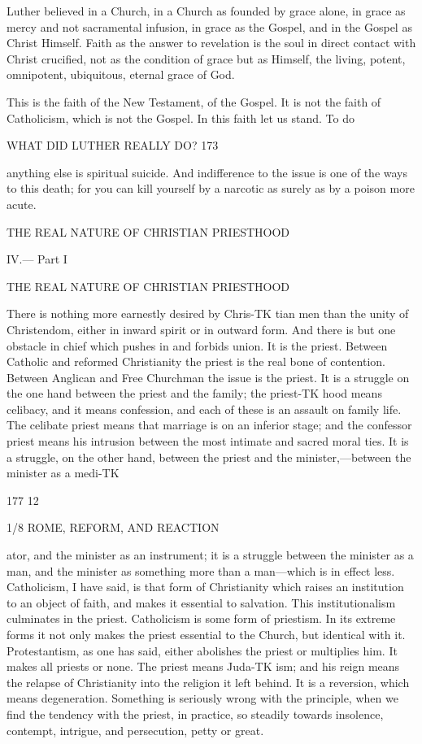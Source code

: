 \documentclass[12pt,a5paper,oneside]{book}
\begin{document}
{Luther believed in a Church, in a Church as founded 
by grace alone, in grace as mercy and not sacramental 
infusion, in grace as the Gospel, and in the Gospel as 
Christ Himself. Faith as the answer to revelation is 
the soul in direct contact with Christ crucified, not 
as the condition of grace but as Himself, the living, 
potent, omnipotent, ubiquitous, eternal grace of God. 

This is the faith of the New Testament, of the 
Gospel. It is not the faith of Catholicism, which is 
not the Gospel. In this faith let us stand. To do 



WHAT DID LUTHER REALLY DO? 173 

anything else is spiritual suicide. And indifference to 
the issue is one of the ways to this death; for you can 
kill yourself by a narcotic as surely as by a poison 
more acute. 



THE REAL NATURE OF CHRISTIAN 
PRIESTHOOD 



IV.— Part I 

THE REAL NATURE OF CHRISTIAN 
PRIESTHOOD 



There is nothing more earnestly desired by Chris-TK
tian men than the unity of Christendom, either in 
inward spirit or in outward form. And there is but 
one obstacle in chief which pushes in and forbids 
union. It is the priest. Between Catholic and 
reformed Christianity the priest is the real bone of 
contention. Between Anglican and Free Churchman 
the issue is the priest. It is a struggle on the one 
hand between the priest and the family; the priest-TK
hood means celibacy, and it means confession, and 
each of these is an assault on family life. The celibate 
priest means that marriage is on an inferior stage; 
and the confessor priest means his intrusion between 
the most intimate and sacred moral ties. It is a 
struggle, on the other hand, between the priest and 
the minister,---between the minister as a medi-TK

177 12 



1/8 ROME, REFORM, AND REACTION 

ator, and the minister as an instrument; it is a 
struggle between the minister as a man, and the 
minister as something more than a man---which is 
in effect less. Catholicism, I have said, is that form 
of Christianity which raises an institution to an object 
of faith, and makes it essential to salvation. This 
institutionalism culminates in the priest. Catholicism 
is some form of priestism. In its extreme forms it 
not only makes the priest essential to the Church, 
but identical with it. Protestantism, as one has said, 
either abolishes the priest or multiplies him. It 
makes all priests or none. The priest means Juda-TK
ism; and his reign means the relapse of Christianity 
into the religion it left behind. It is a reversion, 
which means degeneration. Something is seriously 
wrong with the principle, when we find the tendency 
with the priest, in practice, so steadily towards insolence, 
contempt, intrigue, and persecution, petty or great. 

}
\end{document}
